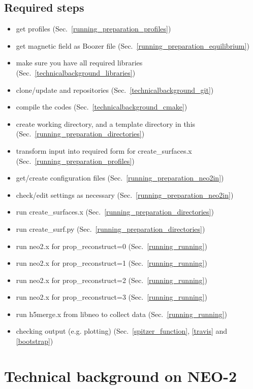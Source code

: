 \documentclass{article}
\newcommand{\vv}[1]{\texttt{\detokenize{#1}}}
\begin{document}
\subsection{Required steps}
\begin{itemize}
  \item get profiles (Sec.~\ref{running_preparation_profiles})
  \item get magnetic field as Boozer file (Sec.~\ref{running_preparation_equilibrium})
  \item make sure you have all required libraries (Sec.~\ref{technicalbackground_libraries})
  \item clone/update \vv{libneo} and \vv{NEO-2} repositories (Sec.~\ref{technicalbackground_git})
  \item compile the codes (Sec.~\ref{technicalbackground_cmake})
  \item create working directory, and a template directory in this (Sec.~\ref{running_preparation_directories})
  \item transform input into required form for create\_surfaces.x (Sec.~\ref{running_preparation_profiles})
  \item get/create configuration files (Sec.~\ref{running_preparation_neo2in})
  \item check/edit settings as necessary (Sec.~\ref{running_preparation_neo2in})
  \item run create\_surfaces.x (Sec.~\ref{running_preparation_directories})
  \item run create\_surf.py (Sec.~\ref{running_preparation_directories})
  \item run neo2.x for prop\_reconstruct=0 (Sec.~\ref{running_running})
  \item run neo2.x for prop\_reconstruct=1 (Sec.~\ref{running_running})
  \item run neo2.x for prop\_reconstruct=2 (Sec.~\ref{running_running})
  \item run neo2.x for prop\_reconstruct=3 (Sec.~\ref{running_running})
  \item run h5merge.x from libneo to collect data (Sec.~\ref{running_running})
  \item checking output (e.g. plotting) (Sec.~\ref{spitzer_function}, \ref{travis} and \ref{bootstrap})
\end{itemize}

\section{Technical background on NEO-2}
\end{document}
